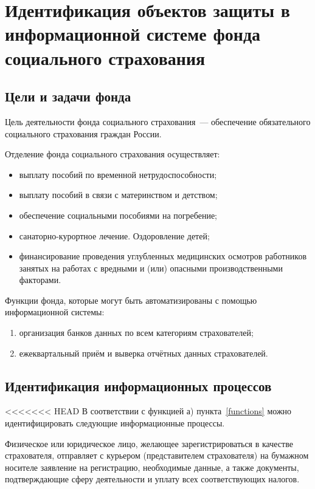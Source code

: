 \section{Идентификация объектов защиты в
  информационной системе фонда
  социального страхования}

\subsection{Цели и задачи фонда}

\point Цель деятельности фонда социального страхования~--- обеспечение обязательного социального страхования граждан России.

\point Отделение фонда социального страхования осуществляет:

\begin{itemize}
\item выплату пособий по временной нетрудоспособности;
\item выплату пособий в связи с материнством и детством;
\item обеспечение социальными пособиями на погребение;
\item санаторно-курортное лечение. Оздоровление детей;
\item финансирование проведения углубленных медицинских осмотров работников занятых на работах с вредными и (или) опасными производственными факторами.
\end{itemize}

\point Функции фонда, которые могут быть автоматизированы с помощью информационной системы: \label{functions}

\begin{enumerate}
\item организация банков данных по всем категориям страхователей;
\item ежеквартальный приём и выверка отчётных данных страхователей.
\end{enumerate}

\subsection{Идентификация информационных процессов}

<<<<<<< HEAD
В соответствии с функцией а) пункта~\ref{functions} можно
идентифицировать следующие информационные процессы.

\point Физическое или юридическое лицо, желающее зарегистрироваться в
качестве страхователя, отправляет с курьером (представителем
страхователя) на бумажном носителе заявление на регистрацию,
необходимые данные, а также документы, подтверждающие сферу
деятельности и уплату всех соответствующих налогов.

